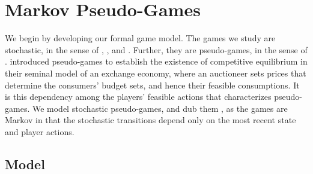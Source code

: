 \section{Markov Pseudo-Games}
\label{sec:gmg}

We begin by developing our formal game model.
The games we study are stochastic, in the sense of \citet{shapley1953stochastic}, \citet{fink1964equilibrium}, and \citet{takahashi1964equilibrium}.
Further, they are pseudo-games, in the sense of \citet{arrow-debreu}.
\citeauthor{arrow-debreu} introduced pseudo-games to establish the existence of competitive equilibrium in their seminal model of an exchange economy, where an auctioneer sets prices that determine the consumers' budget sets, and hence their feasible consumptions.
It is this dependency among the players' feasible actions that characterizes pseudo-games.
%
We model stochastic pseudo-games, and dub them , as the games are Markov in that the stochastic transitions depend only on the most recent state and player actions.




\subsection{Model}
\label{sec:gmg_model}


